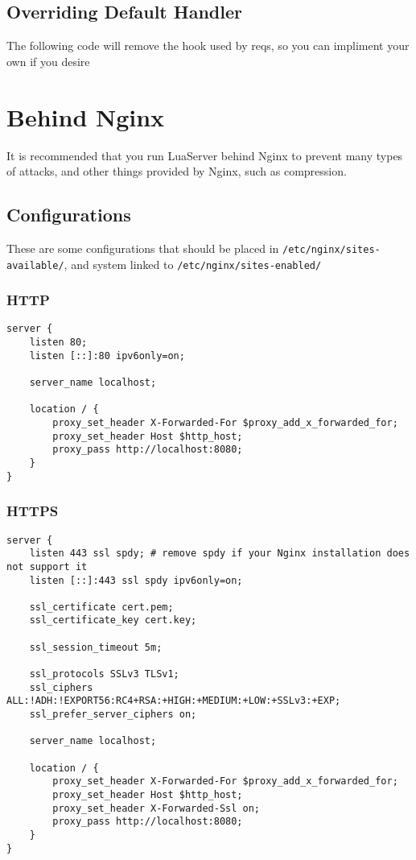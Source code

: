 \documentclass[a4paper,11pt]{report}
\newcommand{\setlua}{\lstset{language=Lua}}
\newcommand{\setnginx}{\lstset{language=sh}}
\newcommand{\inlinecode}{\texttt}
\begin{document}
\setlua

\section{Overriding Default Handler}

The following code will remove the hook used by reqs, so you can impliment your own if you desire

\chapter{Behind Nginx}

It is recommended that you run LuaServer behind Nginx to prevent many types of attacks, and other things provided by Nginx, such as compression.

\section{Configurations}
These are some configurations that should be placed in \inlinecode{/etc/nginx/sites-available/}, and system linked to \inlinecode{/etc/nginx/sites-enabled/}

\subsection{HTTP}

\begin{lstlisting}
server {
    listen 80;
    listen [::]:80 ipv6only=on;

    server_name localhost;

    location / {
        proxy_set_header X-Forwarded-For $proxy_add_x_forwarded_for;
        proxy_set_header Host $http_host;
        proxy_pass http://localhost:8080;
    }
}
\end{lstlisting}

\subsection{HTTPS}

\setnginx
\begin{lstlisting}
server {
    listen 443 ssl spdy; # remove spdy if your Nginx installation does not support it
    listen [::]:443 ssl spdy ipv6only=on;

    ssl_certificate cert.pem;
    ssl_certificate_key cert.key;

    ssl_session_timeout 5m;

    ssl_protocols SSLv3 TLSv1;
    ssl_ciphers ALL:!ADH:!EXPORT56:RC4+RSA:+HIGH:+MEDIUM:+LOW:+SSLv3:+EXP;
    ssl_prefer_server_ciphers on;

    server_name localhost;

    location / {
        proxy_set_header X-Forwarded-For $proxy_add_x_forwarded_for;
        proxy_set_header Host $http_host;
        proxy_set_header X-Forwarded-Ssl on;
        proxy_pass http://localhost:8080;
    }
}
\end{lstlisting}
\end{document}
